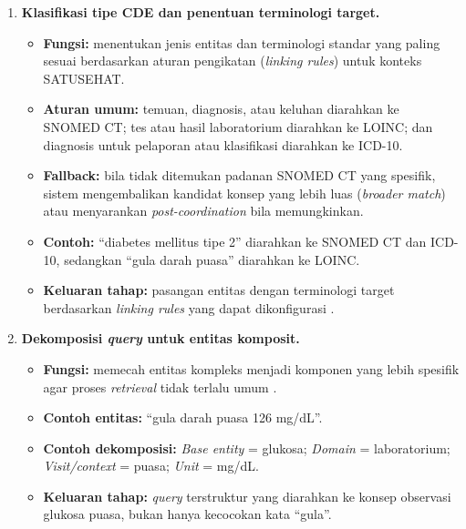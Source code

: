 {{\begin{enumerate}
    \item \textbf{Klasifikasi tipe CDE dan penentuan terminologi target.}
    \begin{itemize}
        \item \textbf{Fungsi:} menentukan jenis entitas dan terminologi standar yang paling sesuai berdasarkan aturan pengikatan (\textit{linking rules}) untuk konteks SATUSEHAT.
        \item \textbf{Aturan umum:} temuan, diagnosis, atau keluhan diarahkan ke SNOMED CT; tes atau hasil laboratorium diarahkan ke LOINC; dan diagnosis untuk pelaporan atau klasifikasi diarahkan ke ICD-10.
        \item \textbf{Fallback:} bila tidak ditemukan padanan SNOMED CT yang spesifik, sistem mengembalikan kandidat konsep yang lebih luas (\textit{broader match}) atau menyarankan \textit{post-coordination} bila memungkinkan.
        \item \textbf{Contoh:} ``diabetes mellitus tipe 2'' diarahkan ke SNOMED CT dan ICD-10, sedangkan ``gula darah puasa'' diarahkan ke LOINC.
        \item \textbf{Keluaran tahap:} pasangan entitas dengan terminologi target berdasarkan \textit{linking rules} yang dapat dikonfigurasi \citep{ayuningtyas_bringing_2025}.
    \end{itemize}

    \item \textbf{Dekomposisi \textit{query} untuk entitas komposit.}
    \begin{itemize}
        \item \textbf{Fungsi:} memecah entitas kompleks menjadi komponen yang lebih spesifik agar proses \textit{retrieval} tidak terlalu umum \citep{gilani_cde-mapper_2025}.
        \item \textbf{Contoh entitas:} ``gula darah puasa 126 mg/dL''.
        \item \textbf{Contoh dekomposisi:} \textit{Base entity} = glukosa; \textit{Domain} = laboratorium; \textit{Visit/context} = puasa; \textit{Unit} = mg/dL.
        \item \textbf{Keluaran tahap:} \textit{query} terstruktur yang diarahkan ke konsep observasi glukosa puasa, bukan hanya kecocokan kata ``gula''.
    \end{itemize}


\end{enumerate}}}
